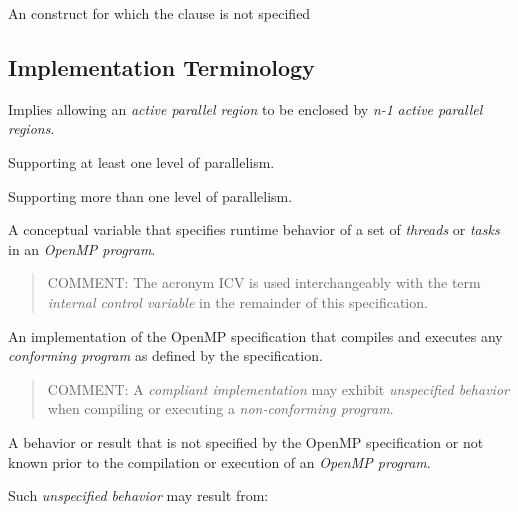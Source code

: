 \glossarydefstart
An  construct for which the  clause is not specified
\glossarydefend
\bigskip
\bigskip
\bigskip





\subsection{Implementation Terminology}
\label{subsec:Implementation Terminology}
\glossarydefstart
Implies allowing an \emph{active parallel region} to be enclosed by \emph{n-1} \emph{active parallel 
regions}.
\glossarydefend

\glossarydefstart
Supporting at least one level of parallelism.
\glossarydefend
\bigskip

\glossarydefstart
Supporting more than one level of parallelism.  
\glossarydefend
\bigskip

\glossarydefstart
A conceptual variable that specifies runtime behavior of a set of \emph{threads} or \emph{tasks} 
in an \emph{OpenMP program}.

\begin{quote}
COMMENT: The acronym ICV is used interchangeably with the term \emph{internal 
control variable} in the remainder of this specification.
\end{quote}
\glossarydefend

\glossarydefstart
An implementation of the OpenMP specification that compiles and executes any 
\emph{conforming program} as defined by the specification.

\begin{quote}
COMMENT: A \emph{compliant implementation} may exhibit \emph{unspecified behavior} when 
compiling or executing a \emph{non-conforming program}.
\end{quote}
\glossarydefend

\glossarydefstart
A behavior or result that is not specified by the OpenMP specification or not 
known prior to the compilation or execution of an \emph{OpenMP program}.

Such \emph{unspecified behavior} may result from:

